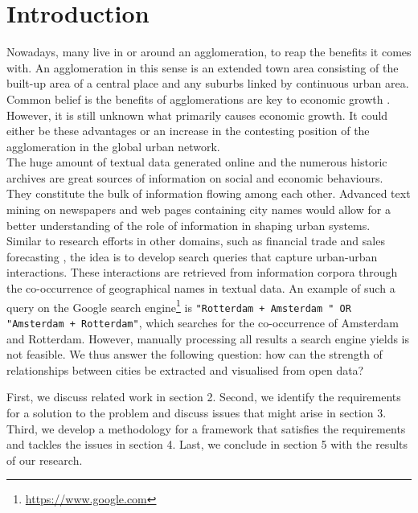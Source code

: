 \section{Introduction}

Nowadays, many live in or around an agglomeration, to reap the benefits it comes with. An agglomeration in this sense is an extended town area consisting of the built-up area of a central place and any suburbs linked by continuous urban area. Common belief is the benefits of agglomerations are key to economic growth \cite{porter2000location}. However, it is still unknown what primarily causes economic growth. It could either be these advantages or an increase in the contesting position of the agglomeration in the global urban network. \\

The huge amount of textual data generated online and the numerous historic archives are great sources of information on social and economic behaviours. They constitute the bulk of information flowing among each other. Advanced text mining on newspapers and web pages containing city names would allow for a better understanding of the role of information in shaping urban systems.\\
Similar to research efforts in other domains, such as financial trade \cite{preis2013quantifying} and sales forecasting \cite{wu2014future}, the idea is to develop search queries that capture urban-urban interactions. These interactions are retrieved from information corpora through the co-occurrence of geographical names in textual data. An example of such a query on the Google search engine\footnote{\url{https://www.google.com}} is \texttt{"Rotterdam + Amsterdam " OR "Amsterdam + Rotterdam"}, which searches for the co-occurrence of Amsterdam and Rotterdam. However, manually processing all results a search engine yields is not feasible. We thus answer the following question: 
how can the strength of relationships between cities be extracted and visualised from open data?

First, we discuss related work in section 2. Second, we identify the requirements for a solution to the problem and discuss issues that might arise in section 3. Third, we develop a methodology for a framework that satisfies the requirements and tackles the issues in section 4. Last, we conclude in section 5 with the results of our research.